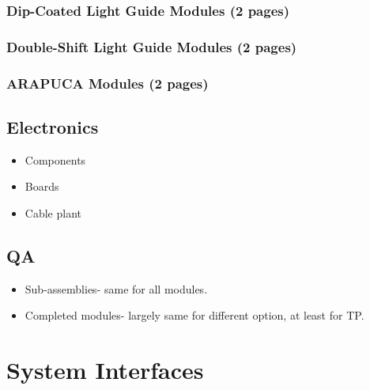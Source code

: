 \subsubsection{Dip-Coated Light Guide Modules (2 pages)}
\label{ssec:fdsp-pd-pc-assy-bar1}

\subsubsection{Double-Shift Light Guide Modules (2 pages)}
\label{ssec:fdsp-pd-pc-assy-bar2}

\subsubsection{ARAPUCA Modules (2 pages)}
\label{ssec:fdsp-pd-pc-assy-arapuca}


\subsection{Electronics}
\label{sec:fdsp-pd-assy-pde}


\begin{itemize}
\item Components
\item Boards
\item Cable plant
\end{itemize}

\subsection{QA}
\label{sec:fdsp-pd-assy-qa}

\begin{itemize}
\item Sub-assemblies- same for all modules.
\item Completed modules- largely same for different option, at least for TP.
\end{itemize}


\section{System Interfaces}
\label{sec:fdsp-pd-intfc}

